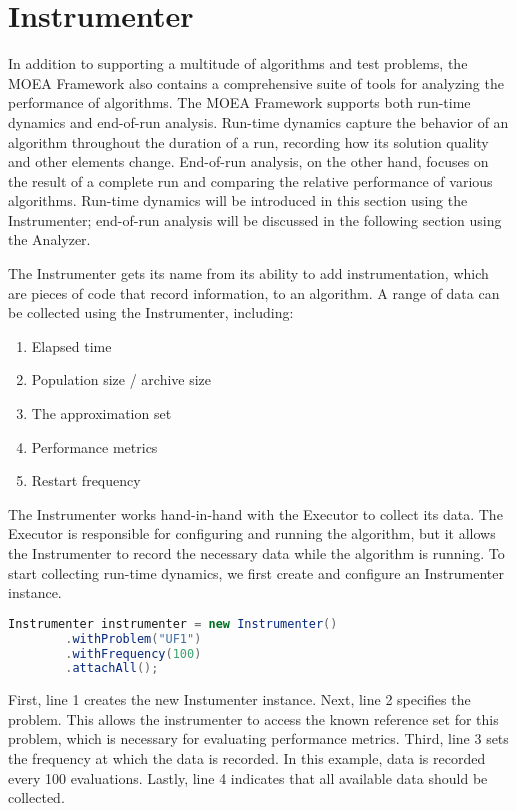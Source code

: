 \section{Instrumenter}
In addition to supporting a multitude of algorithms and test problems, the MOEA Framework also contains a comprehensive suite of tools for analyzing the performance of algorithms.  The MOEA Framework supports both run-time dynamics and end-of-run analysis.  Run-time dynamics capture the behavior of an algorithm throughout the duration of a run, recording how its solution quality and other elements change.  End-of-run analysis, on the other hand, focuses on the result of a complete run and comparing the relative performance of various algorithms.  Run-time dynamics will be introduced in this section using the Instrumenter; end-of-run analysis will be discussed in the following section using the Analyzer.

The Instrumenter gets its name from its ability to add instrumentation, which are pieces of code that record information, to an algorithm.  A range of data can be collected using the Instrumenter, including:

\begin{enumerate}
  \item Elapsed time
  \item Population size / archive size
  \item The approximation set
  \item Performance metrics
  \item Restart frequency
\end{enumerate}

The Instrumenter works hand-in-hand with the Executor to collect its data.  The Executor is responsible for configuring and running the algorithm, but it allows the Instrumenter to record the necessary data while the algorithm is running.  To start collecting run-time dynamics, we first create and configure an Instrumenter instance.

\begin{lstlisting}[language=Java]
Instrumenter instrumenter = new Instrumenter()
		.withProblem("UF1")
		.withFrequency(100)
		.attachAll();
\end{lstlisting}

First, line 1 creates the new Instumenter instance.  Next, line 2 specifies the problem.  This allows the instrumenter to access the known reference set for this problem, which is necessary for evaluating performance metrics.  Third, line 3 sets the frequency at which the data is recorded.  In this example, data is recorded every 100 evaluations.  Lastly, line 4 indicates that all available data should be collected.

